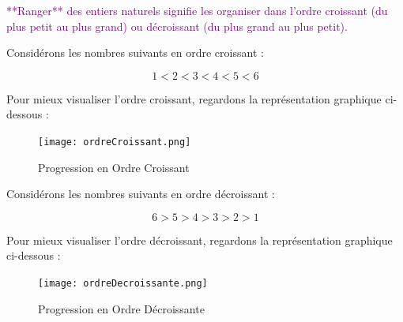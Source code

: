\documentclass{article}
\begin{document}
\vspace{0.5cm}

\textcolor{purple}{**Ranger** des entiers naturels signifie les organiser dans l'ordre croissant (du plus petit au plus grand) ou décroissant (du plus grand au plus petit).}

\vspace{0.5cm}

Considérons les nombres suivants en ordre croissant :

\[ 1 < 2 < 3 < 4 < 5 < 6 \]

Pour mieux visualiser l'ordre croissant, regardons la représentation graphique ci-dessous :

\begin{center}
\end{center}

\begin{figure}[H]
    \centering
    \texttt{[image: ordreCroissant.png]}
    \caption{Progression en Ordre Croissant}
    \label{fig:enter-label}
\end{figure}

Considérons les nombres suivants en ordre décroissant :

\[ 6 > 5 > 4 > 3 > 2 > 1 \]

Pour mieux visualiser l'ordre décroissant, regardons la représentation graphique ci-dessous :

\begin{center}
\end{center}

\begin{figure}[H]
    \centering
    \texttt{[image: ordreDecroissante.png]}
    \caption{Progression en Ordre Décroissante}
    \label{fig:enter-label}
\end{figure}
\end{document}
